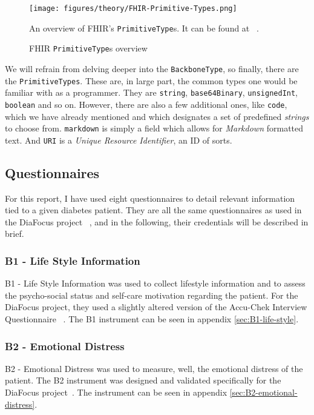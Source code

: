 \begin{figure}[H]
    \centering
    \texttt{[image: figures/theory/FHIR-Primitive-Types.png]}
    \caption{FHIR \texttt{PrimitiveType}s overview}
    \medskip
    \small
    \raggedright
    An overview of FHIR's \texttt{PrimitiveType}s. It can be found at ~\cite{FHIR-data-types-overview}.
    \label{fig:FHIR-Primitive-Types}
\end{figure}

\noindent
We will refrain from delving deeper into the \texttt{BackboneType}, so finally, there are the \texttt{PrimitiveTypes}. These are, in large part, the common types one would be familiar with as a programmer. They are \texttt{string}, \texttt{base64Binary}, \texttt{unsignedInt}, \texttt{boolean} and so on. However, there are also a few additional ones, like \texttt{code}, which we have already mentioned and which designates a set of predefined \emph{strings} to choose from. \texttt{markdown} is simply a field which allows for \emph{Markdown} formatted text. And \texttt{URI} is a \emph{Unique Resource Identifier}, an ID of sorts.

\subsection{Questionnaires}
For this report, I have used eight questionnaires to detail relevant information tied to a given diabetes patient. They are all the same questionnaires as used in the DiaFocus project ~\cite{DiaFocus}, and in the following, their credentials will be described in brief. 

\subsubsection*{B1 - Life Style Information}
B1 - Life Style Information was used to collect lifestyle information and to assess the psycho-social status and self-care motivation regarding the patient. For the DiaFocus project, they used a slightly altered version of the Accu-Chek Interview Questionnaire ~\cite{Accu-Chek}. The B1 instrument can be seen in appendix \autoref{sec:B1-life-style}.

\subsubsection*{B2 - Emotional Distress}
B2 - Emotional Distress was used to measure, well, the emotional distress of the patient. The B2 instrument was designed and validated specifically for the DiaFocus project~\cite{DiaFocus}. The instrument can be seen in appendix \autoref{sec:B2-emotional-distress}.

